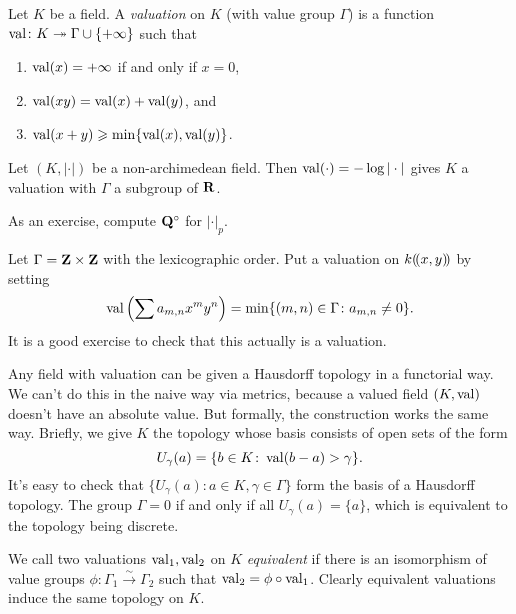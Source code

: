 \begin{definition}
Let $K$ be a field. A \emph{valuation} on $K$ (with value group $\Gamma$) is a 
function $\operatorname{val}\colon K\twoheadrightarrow \Gamma\cup\{+\infty\}$ such that 
\begin{enumerate}
\item
$\operatorname{val}(x)=+\infty$ if and only if $x=0$, 

\item
$\operatorname{val}(x y) = \operatorname{val}(x)+\operatorname{val}(y)$, and 

\item
$\operatorname{val}(x+y)\geqslant \min\{\operatorname{val}(x),\operatorname{val}(y)\}$. 
\end{enumerate}
\end{definition}

\begin{example}
Let $(K,|\cdot|)$ be a non-archimedean field. Then 
$\operatorname{val}(\cdot)=-\log|\cdot|$ gives $K$ a valuation with $\Gamma$ a subgroup 
of $\mathbf{R}$. 
\end{example}

As an exercise, compute $\mathbf{Q}^\circ$ for $|\cdot|_p$. 

\begin{example}
Let $\Gamma=\mathbf{Z}\times\mathbf{Z}$ with the lexicographic order. Put a valuation on 
$k(\!( x,y)\!)$ by setting 
\[
  \operatorname{val}\left(\sum a_{m,n} x^m y^n\right) = \min\{(m,n)\in \Gamma\colon a_{m,n}\ne 0\} .
\]
It is a good exercise to check that this actually is a valuation. 
\end{example}

Any field with valuation can be given a Hausdorff topology in a functorial way. 
We can't do this in the naive way via metrics, because a valued field 
$(K,\operatorname{val})$ doesn't have an absolute value. But formally, the construction 
works the same way. Briefly, we give $K$ the topology whose basis consists of 
open sets of the form 
\[
  U_\gamma(a) = \{b\in K\colon \operatorname{val}(b-a)>\gamma\} .
\]
It's easy to check that $\{U_\gamma(a)\colon a\in K,\gamma\in \Gamma\}$ form 
the basis of a Hausdorff topology. The group $\Gamma=0$ if and only if all 
$U_\gamma(a)=\{a\}$, which is equivalent to the topology being discrete. 

We call two valuations $\operatorname{val}_1,\operatorname{val}_2$ on $K$ \emph{equivalent} if 
there is an isomorphism of value groups 
$\phi\colon\Gamma_1\xrightarrow\sim\Gamma_2$ such that 
$\operatorname{val}_2 = \phi\circ\operatorname{val}_1$. Clearly equivalent valuations induce 
the same topology on $K$. 

